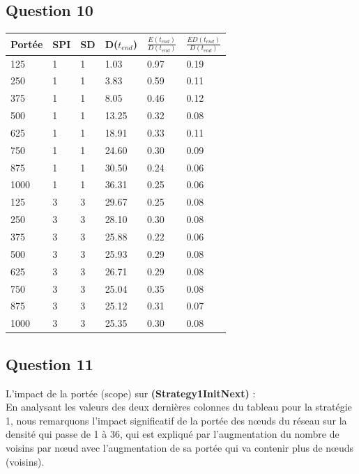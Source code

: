 \documentclass[10pt]{report}
\begin{document}
\subsection{Question 10}

\begin{center}
\captionsetup{type=figure}
\begin{tabular}{|l|l|l|l|l|l|} \hline
  	Portée & SPI & SD & D($t_{end}$) & $\frac{E(t_{end})}{D(t_{end})}$ & $\frac{ED(t_{end})}{D(t_{end})}$\\ \hline
	125 & 1 & 1 & 1.03 & 0.97 & 0.19\\ \hline
	250 & 1 & 1 & 3.83 & 0.59 & 0.11\\ \hline
	375 & 1 & 1 & 8.05 & 0.46 & 0.12\\ \hline
	500 & 1 & 1 & 13.25 & 0.32 & 0.08\\ \hline
	625 & 1 & 1 & 18.91 & 0.33 & 0.11\\ \hline
	750 & 1 & 1 & 24.60 & 0.30 & 0.09\\ \hline
	875 & 1 & 1 & 30.50 & 0.24 & 0.06\\ \hline
	1000 & 1 & 1 & 36.31 & 0.25 & 0.06\\ \hline
	125 & 3 & 3 & 29.67 & 0.25 & 0.08\\ \hline
	250 & 3 & 3 & 28.10 & 0.30 & 0.08\\ \hline
	375 & 3 & 3 & 25.88 & 0.22 & 0.06\\ \hline
	500 & 3 & 3 & 25.93 & 0.29 & 0.08\\ \hline
	625 & 3 & 3 & 26.71 & 0.29 & 0.08\\ \hline
	750 & 3 & 3 & 25.04 & 0.35 & 0.08\\ \hline
	875 & 3 & 3 & 25.12 & 0.31 & 0.07\\ \hline
	1000 & 3 & 3 & 25.35 & 0.30 & 0.08\\ \hline
\end{tabular}
\end{center}

\subsection{Question 11}

L'impact de la portée (scope) sur \textbf{(Strategy1InitNext)} :\\
En analysant les valeurs des deux dernières colonnes du tableau pour la stratégie 1, nous remarquons l'impact significatif de la portée des nœuds du réseau sur la densité qui passe de 1 à 36, qui est expliqué par l'augmentation du nombre de voisins par nœud avec l'augmentation de sa portée qui va contenir plus de nœuds (voisins).\\
\end{document}
